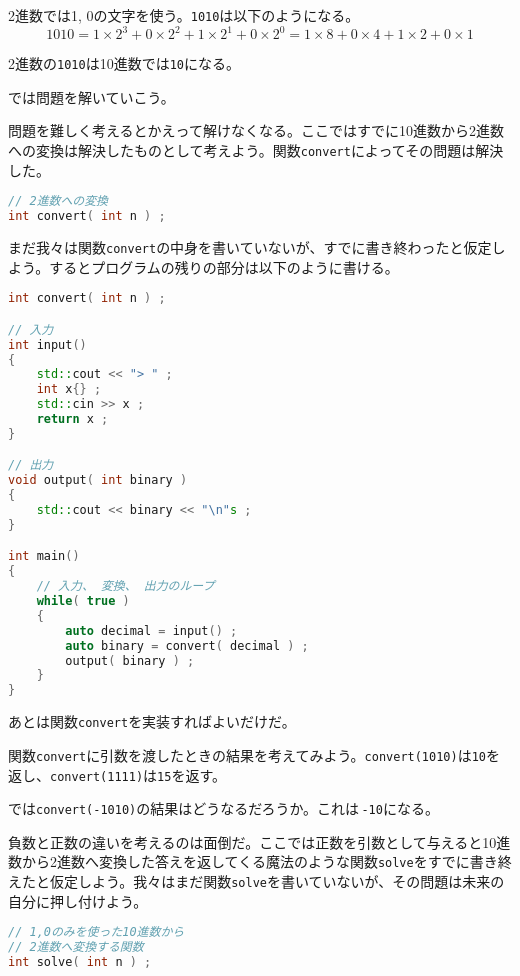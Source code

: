 2進数では1, 0の文字を使う。\texttt{1010}は以下のようになる。
\[
1010 = 1 \times 2^3 + 0 \times 2^2 + 1 \times 2^1 + 0 \times 2^0 = 1 \times 8 + 0 \times 4 + 1 \times 2 + 0 \times 1
\]

2進数の\texttt{1010}は10進数では\texttt{10}になる。

では問題を解いていこう。

問題を難しく考えるとかえって解けなくなる。ここではすでに10進数から2進数への変換は解決したものとして考えよう。関数\texttt{convert}によってその問題は解決した。

\begin{lstlisting}[language={C++}]
// 2進数への変換
int convert( int n ) ;
\end{lstlisting}

まだ我々は関数\texttt{convert}の中身を書いていないが、すでに書き終わったと仮定しよう。するとプログラムの残りの部分は以下のように書ける。

\begin{lstlisting}[language={C++}]
int convert( int n ) ;

// 入力
int input()
{
    std::cout << "> " ;
    int x{} ;
    std::cin >> x ;
    return x ;
}

// 出力
void output( int binary )
{
    std::cout << binary << "\n"s ;
}

int main()
{
    // 入力、 変換、 出力のループ
    while( true )
    {
        auto decimal = input() ;
        auto binary = convert( decimal ) ;
        output( binary ) ;
    } 
}
\end{lstlisting}

あとは関数\texttt{convert}を実装すればよいだけだ。

関数\texttt{convert}に引数を渡したときの結果を考えてみよう。\texttt{convert(1010)}は\texttt{10}を返し、\texttt{convert(1111)}は\texttt{15}を返す。

では\texttt{convert(-1010)}の結果はどうなるだろうか。これは\,\texttt{-10}になる。

負数と正数の違いを考えるのは面倒だ。ここでは正数を引数として与えると10進数から2進数へ変換した答えを返してくる魔法のような関数\texttt{solve}をすでに書き終えたと仮定しよう。我々はまだ関数\texttt{solve}を書いていないが、その問題は未来の自分に押し付けよう。

\ifTombow\pagebreak\fi
\begin{lstlisting}[language={C++}]
// 1,0のみを使った10進数から
// 2進数へ変換する関数
int solve( int n ) ;
\end{lstlisting}

